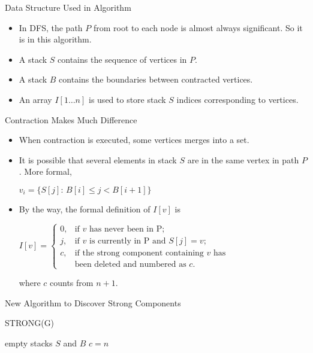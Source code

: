 \documentclass{beamer}
\begin{document}
\begin{frame}{Data Structure Used in Algorithm}
	\begin{itemize}
		\item
		In DFS, the \alert{path $P$} from root to each node is almost always significant. So it is in this algorithm.
		\item
		A \alert{stack $S$} contains the sequence of vertices in $P$.
		\item
		A \alert{stack $B$} contains the boundaries between contracted vertices.
		\item
		An array \alert{$I[1\ldots n]$} is used to store stack $S$ indices corresponding to vertices.
	\end{itemize}
\end{frame}

\begin{frame}{Contraction Makes Much Difference}
	\begin{itemize}
		\item
		When contraction is executed, some vertices merges into a set.
		\item
		It is possible that several elements in stack $S$ are in the same vertex in path $P$.
		More formal, 
		\begin{center}
			$v_i=\{S[j]:\, B[i]\leq j< B[i+1]\}$
		\end{center}
		\item
		By the way, the formal definition of $I[v]$ is
		\begin{center}
			$I[v]=\begin{cases}
			0, & \text{if }v\text{ has never been in P;} \\
			j, & \text{if }v\text{ is currently in P and }S[j]=v\text{;} \\
			c, & \text{if the strong component containing }v\text{ has}\\
			& \text{been deleted and numbered as }c\text{.}
			\end{cases}$
		\end{center}
		where $c$ counts from $n+1$.
	\end{itemize}
\end{frame}

\begin{frame}[fragile]{New Algorithm to Discover Strong Components}
	\SetAlFnt{\normalsize}
	\begin{procedure}[H]
		\caption{STRONG(G)}
		empty stacks $S$ and $B$\;
		$c=n$\;
	\end{procedure}
\end{frame}
\end{document}

